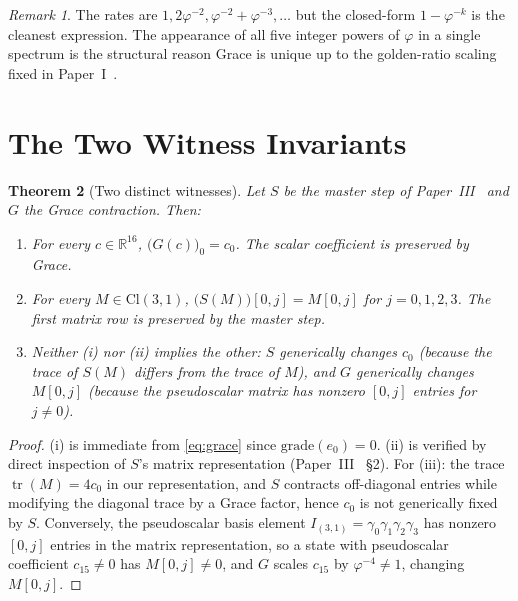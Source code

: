 \documentclass[11pt,a4paper]{article}
\theoremstyle{plain}
\newtheorem{theorem}{Theorem}[section]
\theoremstyle{definition}
\theoremstyle{remark}
\newtheorem{remark}[theorem]{Remark}
\numberwithin{equation}{section}
\providecommand{\Cl}{\mathrm{Cl}}
\providecommand{\R}{\mathbb{R}}
\providecommand{\vp}{\varphi}
\DeclareMathOperator{\tr}{tr}
\begin{document}
\begin{remark}
The rates are $1, 2\vp^{-2}, \vp^{-2}+\vp^{-3}, \ldots$ but the
closed-form $1 - \vp^{-k}$ is the cleanest expression. The
appearance of all five integer powers of $\vp$ in a single
spectrum is the structural reason Grace is unique up to the
golden-ratio scaling fixed in Paper~I~\cite{paper-I}.
\end{remark}

\section{The Two Witness Invariants}
\label{sec:two-witnesses}

\begin{theorem}[Two distinct witnesses]
\label{thm:two-witnesses}
Let $S$ be the master step of Paper~III~\cite{paper-III} and $G$ the Grace
contraction. Then:
\begin{enumerate}[label=(\roman*)]
\item For every $c \in \R^{16}$, $\big(G(c)\big)_0 = c_0$. The
  scalar coefficient is preserved by Grace.
\item For every $M \in \Cl(3,1)$, $\big(S(M)\big)[0,j] = M[0,j]$
  for $j = 0, 1, 2, 3$. The first matrix row is preserved by the
  master step.
\item Neither (i) nor (ii) implies the other: $S$ generically
  changes $c_0$ (because the trace of $S(M)$ differs from the trace
  of $M$), and $G$ generically changes $M[0,j]$ (because the
  pseudoscalar matrix has nonzero $[0, j]$ entries for $j \ne 0$).
\end{enumerate}
\end{theorem}

\begin{proof}
(i) is immediate from \eqref{eq:grace} since $\mathrm{grade}(e_0) = 0$.
(ii) is verified by direct inspection of $S$'s matrix
representation (Paper~III~\cite{paper-III} \S2). For (iii): the trace
$\tr(M) = 4 c_0$ in our representation, and $S$ contracts off-diagonal
entries while modifying the diagonal trace by a Grace factor, hence
$c_0$ is not generically fixed by $S$. Conversely, the pseudoscalar
basis element $I_{(3,1)} = \gamma_0\gamma_1\gamma_2\gamma_3$ has
nonzero $[0,j]$ entries in the matrix representation, so a state
with pseudoscalar coefficient $c_{15} \ne 0$ has $M[0,j] \ne 0$,
and $G$ scales $c_{15}$ by $\vp^{-4} \ne 1$, changing $M[0,j]$.
\end{proof}
\end{document}
